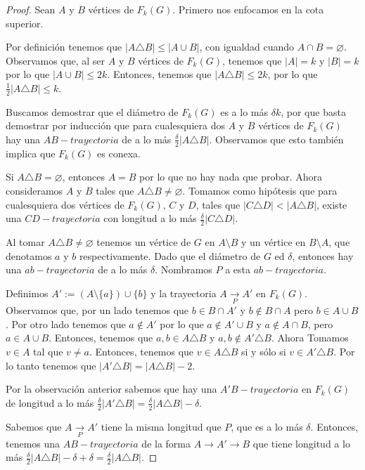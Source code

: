 \begin{proof}
Sean $A$ y $B$ v\'ertices de $F_{k}(G)$. Primero nos enfocamos en la cota
superior.

Por definici\'on tenemos que $|A \triangle B| \leq |A \cup B|$, con igualdad
cuando $A \cap B = \varnothing$. Observamos que, al ser $A$ y $B$ v\'ertices de
$F_{k}(G)$, tenemos que $|A|=k$ y $|B|=k$ por lo que $|A \cup B| \le 2k$.
Entonces, tenemos que $|A \triangle B| \leq 2k$, por lo que $\frac{1}{2} |A
\triangle B| \leq k$.

Buscamos demostrar que el di\'ametro de $F_{k}(G)$ es a lo m\'as $\delta k$, por
que basta demostrar por inducci\'on que para cualesquiera dos $A$ y $B$
v\'ertices de $F_{k}(G)$ hay una $AB-trayectoria$ de a lo m\'as
$\frac{\delta}{2}|A\triangle B|$. Observamos que esto tambi\'en implica que
$F_{k}(G)$ es conexa.

Si $A\triangle B=\varnothing$, entonces $A=B$ por lo que no hay nada que probar.
Ahora consideramos $A$ y $B$ tales que $A\triangle B \neq \varnothing$. Tomamos
como hip\'otesis que para cualesquiera dos v\'ertices de $F_{k}(G)$, $C$ y $D$,
tales que $|C\triangle D|<|A \triangle B|$, existe una $CD-trayectoria$ con
longitud a lo m\'as $\frac{\delta}{2}|C\triangle D|$.

Al tomar $A\triangle B \neq \varnothing$ tenemos un v\'ertice de $G$ en
$A\setminus B$ y un v\'ertice en $B\setminus A$, que denotamos $a$ y $b$
respectivamente. Dado que el di\'ametro de $G$ ed $\delta$, entonces hay una
$ab-trayectoria$ de a lo m\'as $\delta$. Nombramos $P$ a esta $ab-trayectoria$.

Definimos $A':=(A\setminus \{a\})\cup \{b\}$ y la trayectoria
$A\xrightarrow[P]{} A'$ en $F_{k}(G)$. Observamos que, por un lado tenemos que
$b\in B\cap A'$ y $b\notin B\cap A$ pero $b\in A\cup B$. Por otro lado tenemos
que $a\notin A'$ por lo que $a\notin A'\cup B$ y $a\notin A\cap B$, pero $a\in
A\cup B$. Entonces, tenemos que $a,b \in A\triangle B$ y $a,b \notin A'\triangle
B$. Ahora Tomamos $v\in A$ tal que $v\neq a$. Entonces, tenemos que $v \in
A\triangle B$ si y s\'olo si $v\in A'\triangle B$. Por lo tanto tenemos que
$|A'\triangle B|=|A \triangle B|- 2$.

Por la observaci\'on anterior sabemos que hay una $A'B-trayectoria$ en
$F_{k}(G)$ de longitud a lo m\'as $\frac{\delta}{2}|A'\triangle
B|=\frac{\delta}{2}|A\triangle B| - \delta$.

Sabemos que $A\xrightarrow[P]{} A'$ tiene la misma longitud que $P$, que es a lo
m\'as $\delta$. Entonces, tenemos una $AB-trayectoria$ de la forma 
$A\rightarrow A'\rightarrow B$ que tiene longitud a lo m\'as 
$\frac{\delta}{2}|A\triangle B|-\delta +\delta =\frac{\delta}{2}|A\triangle B|$.


\end{proof}
